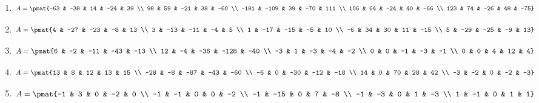 \begin{enumerate}
\item

\begin{align*}
A = \pmat{-63 & -38 & 14 & -24 & 39 \\ 98 & 59 & -21 & 38 & -60 \\ -181 & -109 & 39 & -70 & 111 \\ 106 & 64 & -24 & 40 & -66 \\ 123 & 74 & -26 & 48 & -75}
\end{align*}

\item

\begin{align*}
A = \pmat{4 & -27 & -23 & -8 & 13 \\ 3 & -13 & -11 & -4 & 5 \\ 1 & -17 & -15 & -5 & 10 \\ -6 & 34 & 30 & 11 & -15 \\ 5 & -29 & -25 & -9 & 13}
\end{align*}

\item

\begin{align*}
A = \pmat{6 & -2 & -11 & -43 & -13 \\ 12 & -4 & -36 & -128 & -40 \\ -3 & 1 & -3 & -4 & -2 \\ 0 & 0 & -1 & -3 & -1 \\ 0 & 0 & 4 & 12 & 4}
\end{align*}

\item

\begin{align*}
A = \pmat{13 & 8 & 12 & 13 & 15 \\ -28 & -8 & -87 & -43 & -60 \\ -6 & 0 & -30 & -12 & -18 \\ 14 & 0 & 70 & 28 & 42 \\ -3 & -2 & 0 & -2 & -3}
\end{align*}

\item

\begin{align*}
A = \pmat{-1 & 3 & 0 & -2 & 0 \\ -1 & -1 & 0 & 0 & -2 \\ -1 & -15 & 0 & 7 & -8 \\ -1 & -3 & 0 & 1 & -3 \\ 1 & -1 & 0 & 1 & 1}
\end{align*}


\end{enumerate}
